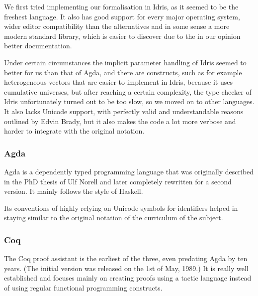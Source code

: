 We first tried implementing our formalisation in Idris, as it seemed to be the freshest language. It also has good support for every major operating system, wider editor compatibility than the alternatives and in some sense a more modern standard library, which is easier to discover due to the in our opinion better documentation.

Under certain circumstances the implicit parameter handling of Idris seemed to better for us than that of Agda, and there are constructs, such as for example heterogeneous vectors that are easier to implement in Idris, because it uses cumulative universes, but
after reaching a certain complexity, the type checker of Idris unfortunately turned out to be too slow, so we moved on to other languages. It also lacks Unicode support, with perfectly valid and understandable reasons outlined by Edvin Brady, but it also makes the code a lot more verbose and harder to integrate with the original notation.



\subsubsection{Agda}
Agda is a dependently typed programming language that was originally described in the PhD thesis of Ulf Norell\cite{norell:thesis} and later completely rewritten for a second version. It mainly follows the style of Haskell.

Its conventions of highly relying on Unicode symbols for identifiers helped in staying similar to the original notation of the curriculum of the subject.

\subsubsection{Coq}
The Coq proof assistant\cite{} is the earliest of the three, even predating Agda by ten years. (The initial version was released on the 1st of May, 1989.) It is really well established and focuses mainly on creating proofs using a tactic language instead of using regular functional programming constructs.